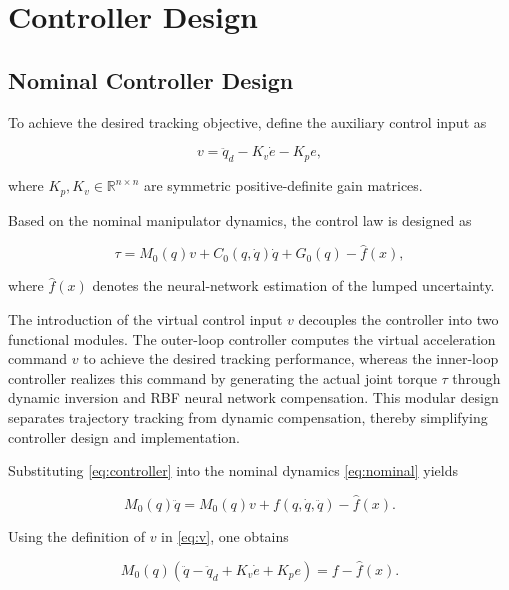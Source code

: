 \section{Controller Design}

\subsection{Nominal Controller Design}

To achieve the desired tracking objective, define the auxiliary control input as

\begin{equation}
	v
	=
	\ddot q_d
	-
	K_v\dot e
	-
	K_pe,
	\label{eq:v}
\end{equation}

where $K_p,K_v\in\mathbb{R}^{n\times n}$ are symmetric positive-definite gain matrices.

Based on the nominal manipulator dynamics, the control law is designed as

\begin{equation}
	\tau
	=
	M_0(q)v
	+
	C_0(q,\dot q)\dot q
	+
	G_0(q)
	-
	\hat f(x),
	\label{eq:controller}
\end{equation}

where $\hat f(x)$ denotes the neural-network estimation of the lumped uncertainty.

\begin{remark}
	The introduction of the virtual control input $v$ decouples the controller into two functional modules. The outer-loop controller computes the virtual acceleration command $v$ to achieve the desired tracking performance, whereas the inner-loop controller realizes this command by generating the actual joint torque $\tau$ through dynamic inversion and RBF neural network compensation. This modular design separates trajectory tracking from dynamic compensation, thereby simplifying controller design and implementation.
\end{remark}

Substituting \eqref{eq:controller} into the nominal dynamics \eqref{eq:nominal} yields

\begin{equation}
	M_0(q)\ddot q
	=
	M_0(q)v
	+
	f(q,\dot q,\ddot q)
	-
	\hat f(x).
\end{equation}

Using the definition of $v$ in \eqref{eq:v}, one obtains

\begin{equation}
	M_0(q)
	\left(
	\ddot q
	-
	\ddot q_d
	+
	K_v\dot e
	+
	K_pe
	\right)
	=
	f
	-
	\hat f(x).
\end{equation}

